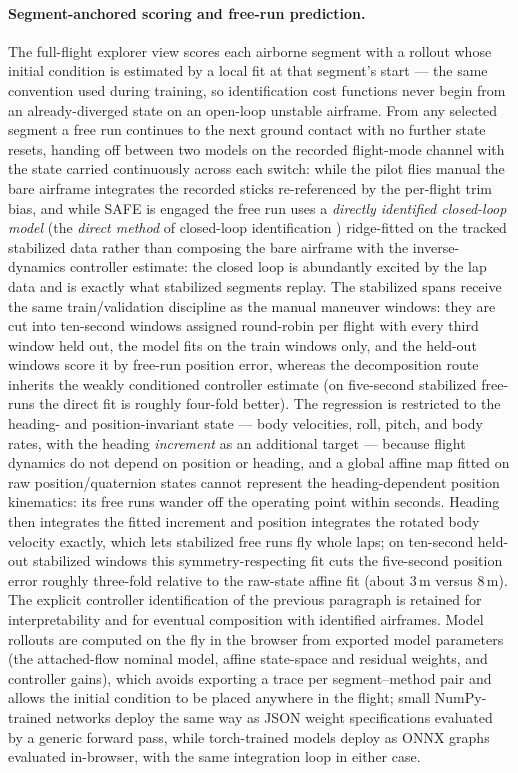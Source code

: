 \documentclass[11pt]{article}
\begin{document}
\paragraph{Segment-anchored scoring and free-run prediction.}
The full-flight explorer view scores each airborne segment with a rollout
whose initial condition is estimated by a local fit at that segment's start —
the same convention used during training, so identification cost functions
never begin from an already-diverged state on an open-loop unstable airframe.
From any selected segment a free run continues to the next ground contact
with no further state resets, handing off between two models on the recorded
flight-mode channel with the state carried continuously across each switch:
while the pilot flies manual the bare airframe integrates the recorded
sticks re-referenced by the per-flight trim bias, and while SAFE is engaged
the free run uses a \emph{directly identified closed-loop model} (the
\emph{direct method} of closed-loop identification \cite{ljung1999system})
ridge-fitted on the tracked stabilized data rather than composing the bare
airframe with the inverse-dynamics controller estimate: the closed loop is
abundantly excited by the lap data and is exactly what stabilized segments
replay. The stabilized spans receive the same train/validation discipline
as the manual maneuver windows: they are cut into ten-second windows
assigned round-robin per flight with every third window held out, the model
fits on the train windows only, and the held-out windows score it by
free-run position error,
whereas the decomposition route inherits the weakly conditioned controller
estimate (on five-second stabilized free-runs the direct fit is roughly
four-fold better). The regression is restricted to the heading- and
position-invariant state --- body velocities, roll, pitch, and body rates,
with the heading \emph{increment} as an additional target --- because flight
dynamics do not depend on position or heading, and a global affine map
fitted on raw position/quaternion states cannot represent the
heading-dependent position kinematics: its free runs wander off the
operating point within seconds. Heading then integrates the fitted
increment and position integrates the rotated body velocity exactly, which
lets stabilized free runs fly whole laps; on ten-second held-out stabilized
windows this symmetry-respecting fit cuts the five-second position error
roughly three-fold relative to the raw-state affine fit (about 3\,m versus
8\,m). The
explicit controller identification of the previous paragraph is retained for
interpretability and for eventual composition with identified airframes. Model rollouts are computed
on the fly in the browser from exported model parameters (the attached-flow
nominal model, affine state-space and residual weights, and controller
gains), which avoids exporting a trace per segment--method pair and allows
the initial condition to be placed anywhere in the flight; small
NumPy-trained networks deploy the same way as JSON weight specifications
evaluated by a generic forward pass, while torch-trained models deploy as
ONNX graphs evaluated in-browser, with the same integration loop in either
case.
\end{document}
